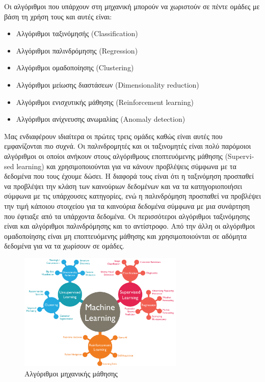 Οι αλγόριθμοι που υπάρχουν στη μηχανική μπορούν να χωριστούν σε πέντε
ομάδες με βάση τη χρήση τους και αυτές είναι:
\begin{itemize}
    \item Αλγόριθμοι ταξινόμησής (\textlatin{Classification})
    \item Αλγόριθμοι παλινδρόμησης (\textlatin{Regression})
    \item Αλγόριθμοι ομαδοποίησης (\textlatin{Clustering})
    \item Αλγόριθμοι μείωσης διαστάσεων (\textlatin{Dimensionality reduction})
    \item Αλγόριθμοι ενισχυτικής μάθησης (\textlatin{Reinforcement learning})
    \item Αλγόριθμοι ανίχνευσης ανωμαλίας (\textlatin{Anomaly detection})
\end{itemize}
Μας ενδιαφέρουν ιδιαίτερα οι πρώτες τρεις ομάδες
καθώς είναι αυτές που
εμφανίζονται πιο συχνά. Οι παλινδρομητές και οι ταξινομητές είναι πολύ παρόμοιοι αλγόριθμοι οι οποίοι ανήκουν στους αλγόριθμους εποπτευόμενης
μάθησης (\textlatin{Supervised learning}) και χρησιμοποιούνται
για να κάνουν προβλέψεις σύμφωνα με τα δεδομένα
που τους έχουμε
δώσει. Η διαφορά τους είναι ότι η ταξινόμηση προσπαθεί να
προβλέψει την κλάση των καινούριων δεδομένων και να τα
κατηγοριοποιήσει σύμφωνα με τις υπάρχουσες κατηγορίες, ενώ η
παλινδρόμηση προσπαθεί να προβλέψει την τιμή κάποιου στοιχείου
για τα καινούρια δεδομένα σύμφωνα με μια συνάρτηση που
έφτιαξε
από τα υπάρχοντα δεδομένα. Οι περισσότεροι αλγόριθμοι ταξινόμησης είναι και
αλγόριθμοι παλινδρόμησης και το αντίστροφο. Από την άλλη οι αλγόριθμοι
ομαδοποίησης είναι μη εποπτευόμενης μάθησης και χρησιμοποιούνται σε αδόμητα
δεδομένα για να τα χωρίσουν σε ομάδες.
\begin{figure}[H]
    \centering
    \includegraphics[width=0.7\textwidth]{images/machineLearning.png}
    \caption{Αλγόριθμοι μηχανικής μάθησης}
\end{figure}